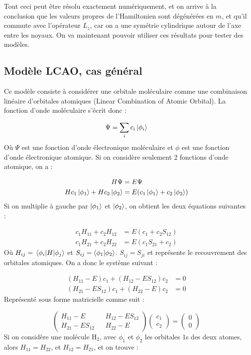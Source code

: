 Tout ceci peut être résolu exactement numériquement, et on arrive à la conclusion que les valeurs propres de l'Hamiltonien sont dégénérées en $m$, et qu'il commute avec l'opérateur $L_z$, car on a une symétrie cylindrique autour de l'axe entre les noyaux. On va maintenant pouvoir utiliser ces résultats pour tester des modèles.


\subsection{Modèle LCAO, cas général}
Ce modèle consiste à considérer une orbitale moléculaire comme une combinaison linéaire d’orbitales atomiques (Linear Combination of Atomic Orbital). La fonction d'onde moléculaire s'écrit donc :

\[ \Psi = \sum\limits_i c_i\ket{\phi_i} \]
Où $\Psi$ est une fonction d'onde électronique moléculaire et $\phi$ est une fonction d'onde électronique atomique.
Si on considère seulement 2 fonctions d'onde atomique, on a :

\begin{align*}
    H\Psi &= E\Psi\\
    Hc_1\ket{\phi_1} + Hc_2\ket{\phi_2}  &= E(c_1\ket{\phi_1} + c_2\ket{\phi_2})
\end{align*}
Si on multiplie à gauche par $\ket{\phi_1}$ et $\ket{\phi_2}$, on obtient les deux équations suivantes :

\begin{align*}
    c_1H_{11} + c_2H_{12} &= E(c_1+c_2S_{12})\\
    c_1H_{21} + c_2H_{22} &= E(c_1S_{21}+c_2)
\end{align*}
Où $H_{ij} = \mel{\phi_i}{H}{\phi_j}$ et $S_{ij} = \braket{\phi_1}{\phi_2}$. $S_{ij} = S_{ji}$ et représente le recouvrement des orbitales atomiques.
On a donc le système suivant :

\begin{align*}
    (H_{11} - E)c_1 + (H_{12} - ES_{12})c_2 &= 0\\
    (H_{21} - ES_{12})c_1 + (H_{22} - E)c_2 &= 0
\end{align*}
Représenté sous forme matricielle comme suit :

\[
    \begin{pmatrix}
        H_{11}-E && H_{12}-ES_{12}\\
        H_{21}-ES_{12} && H_{22}-E
    \end{pmatrix}
    \begin{pmatrix}
        c_1\\
        c_2
    \end{pmatrix}
    =
    \begin{pmatrix}
        0\\
        0
    \end{pmatrix}
\]
Si on considère une molécule H$_2$, avec $\phi_1$ et $\phi_2$ les orbitales 1s des deux atomes, alors $H_{11} = H_{22}$, et $H_{12} = H_{21}$, et on trouve :


